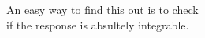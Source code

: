 \documentclass[preview]{standalone}
\begin{document}
\begin{center}
An easy way to find this out is to check \\ if the response is absultely integrable.
\end{center}
\end{document}
